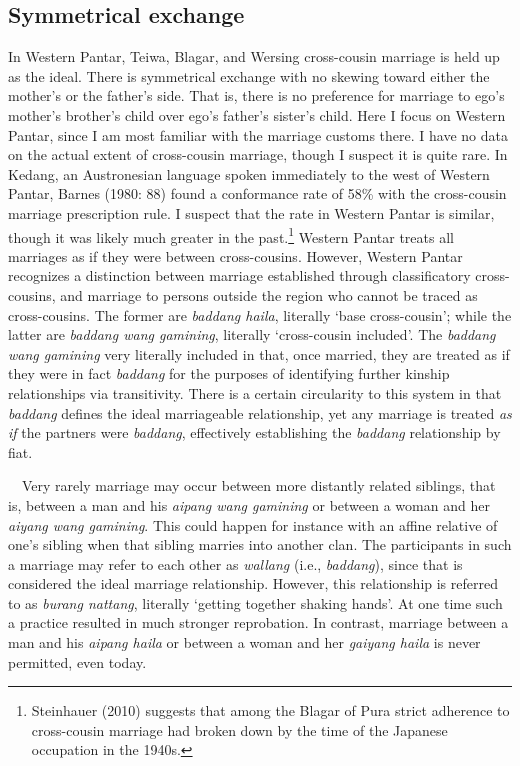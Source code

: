 \subsection[Symmetrical exchange]{Symmetrical exchange}
\hypertarget{RefHeading78037871885726}{}In Western Pantar, Teiwa, Blagar, and Wersing cross-cousin marriage is held up as the ideal. There is symmetrical exchange with no skewing toward either the mother{\textquoteright}s or the father{\textquoteright}s side. That is, there is no preference for marriage to ego{\textquoteright}s mother{\textquoteright}s brother{\textquoteright}s child over ego{\textquoteright}s father{\textquoteright}s sister{\textquoteright}s child. Here I focus on Western Pantar, since I am most familiar with the marriage customs there. I have no data on the actual extent of cross-cousin marriage, though I suspect it is quite rare. In Kedang, an Austronesian language spoken immediately to the west of Western Pantar, Barnes (1980: 88) found a conformance rate of 58\% with the cross-cousin marriage prescription rule. I suspect that the rate in Western Pantar is similar, though it was likely much greater in the past.\footnote{ Steinhauer (2010) suggests that among the Blagar of Pura strict 
adherence to cross-cousin marriage had broken down by the time of the Japanese occupation in the 1940s.} Western Pantar treats all marriages as if they were between cross-cousins. However, Western Pantar recognizes a distinction between marriage established through classificatory cross-cousins, and marriage to persons outside the region who cannot be traced as cross-cousins. The former are \textit{baddang haila}, literally {\textquoteleft}base cross-cousin{\textquoteright}; while the latter are \textit{baddang wang gamining}, literally {\textquoteleft}cross-cousin included{\textquoteright}. The \textit{baddang wang gamining }very literally included in that, once married, they are treated as if they were in fact \textit{baddang} for the purposes of identifying further kinship relationships via transitivity. There is a certain circularity to this system in that \textit{baddang} defines the ideal marriageable relationship, yet any marriage is treated \textit{as if }the partners were \textit{baddang}, 
effectively establishing the \textit{baddang} relationship by fiat. 

\ \ Very rarely marriage may occur between more distantly related siblings, that is, between a man and his \textit{aipang wang gamining} or between a woman and her \textit{aiyang wang gamining}. This could happen for instance with an affine relative of one{\textquoteright}s sibling when that sibling marries into another clan. The participants in such a marriage may refer to each other as \textit{wallang }(i.e., \textit{baddang}), since that is considered the ideal marriage relationship. However, this relationship is referred to as \textit{burang nattang}, literally {\textquoteleft}getting together shaking hands{\textquoteright}. At one time such a practice resulted in much stronger reprobation. In contrast, marriage between a man and his \textit{aipang haila }or between a woman and her \textit{gaiyang haila} is never permitted, even today.

